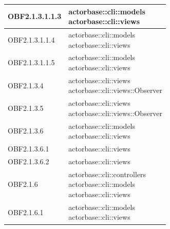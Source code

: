 \documentclass{scalatekids-article}
\begin{document}
\begin{longtable}[H]{|p{6cm}|p{11cm}|}
\hline
OBF2.1.3.1.1.3 & \multiLineCell[t]{actorbase::cli::models\\actorbase::cli::views\\}\\
\hline
OBF2.1.3.1.1.4 & \multiLineCell[t]{actorbase::cli::models\\actorbase::cli::views\\}\\
\hline
OBF2.1.3.1.1.5 & \multiLineCell[t]{actorbase::cli::models\\actorbase::cli::views\\}\\
\hline
OBF2.1.3.4 & \multiLineCell[t]{actorbase::cli::views\\actorbase::cli::views::Observer\\}\\
\hline
OBF2.1.3.5 & \multiLineCell[t]{actorbase::cli::views\\actorbase::cli::views::Observer\\}\\
\hline
OBF2.1.3.6 & \multiLineCell[t]{actorbase::cli::models\\actorbase::cli::views\\}\\
\hline
OBF2.1.3.6.1 & \multiLineCell[t]{actorbase::cli::views\\}\\
\hline
OBF2.1.3.6.2 & \multiLineCell[t]{actorbase::cli::views\\}\\
\hline
OBF2.1.6 & \multiLineCell[t]{actorbase::cli::controllers\\actorbase::cli::models\\actorbase::cli::views\\}\\
\hline
OBF2.1.6.1 & \multiLineCell[t]{actorbase::cli::models\\actorbase::cli::views\\}\\

\end{longtable}
\end{document}
